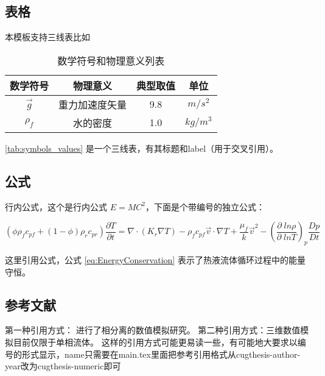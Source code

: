 \subsection{表格}

本模板支持三线表比如

\begin{table}[htbp]
	\centering
	\caption{数学符号和物理意义列表}
	\label{tab:symbols_values}
	\begin{tabular}{cccc}
		\toprule 
		数学符号 & 物理意义 & 典型取值 &单位 \\
		\midrule
		$\vec{g}$ & 重力加速度矢量 & 9.8 & $m/s^2$ \\
		$\rho_f$ & 水的密度 & 1.0 & $kg/m^3$ \\
		\bottomrule
	\end{tabular}
\end{table}

\autoref{tab:symbols_values} 是一个三线表，有其标题和label（用于交叉引用）。

\subsection{公式}

行内公式，这个是行内公式 $E=MC^2$，下面是个带编号的独立公式：

\begin{equation}
\left( {\phi {\rho _f}{c_{pf}} + \left( {1 - \phi } \right){\rho _r}{c_{pr}}} \right)\frac{{\partial T}}{{\partial t}} = \nabla  \cdot \left( {{K_r}\nabla T} \right) - {\rho _f}{c_{pf}}\vec v \cdot \nabla T + \frac{{{\mu _f}}}{k}{\vec v^2} - {\left( {\frac{{\partial \;ln\rho }}{{\partial \;lnT}}} \right)_p}\frac{{Dp}}{{Dt}}
\label{eq:EnergyConservation}
\end{equation}

这里引用公式，公式 \ref{eq:EnergyConservation} 表示了热液流体循环过程中的能量守恒。

\subsection{参考文献}
第一种引用方式：\cite{vehling2018implementation} 进行了相分离的数值模拟研究。
第二种引用方式：三维数值模拟目前仅限于单相流体\citep{coumou2008structure,coumou2006dynamics}。
这样的引用方式可能更易读一些，有可能地大要求以编号的形式显示，name只需要在main.tex里面把参考引用格式从{cugthesis-author-year}改为{cugthesis-numeric即可}